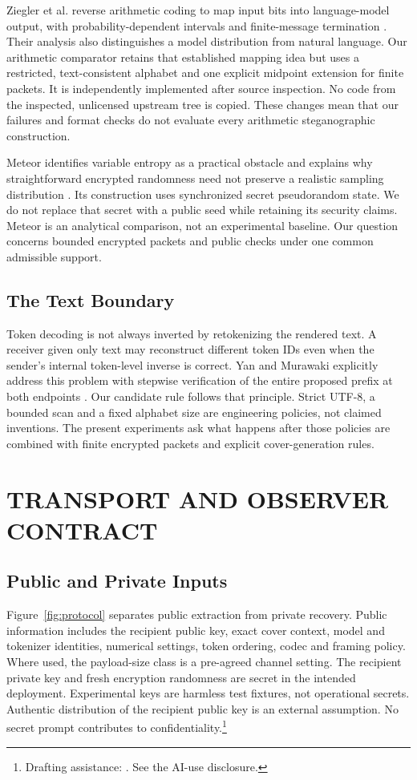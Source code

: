 \documentclass[a4paper,twoside]{article}
\newcommand{\aidraft}{\footnote{Drafting assistance: \cite{openai2026codex}. See the AI-use disclosure.}}
\begin{document}
Ziegler et al. reverse arithmetic coding to map input bits into language-model output, with probability-dependent intervals and finite-message termination \cite{ziegler2019neural}. Their analysis also distinguishes a model distribution from natural language. Our arithmetic comparator retains that established mapping idea but uses a restricted, text-consistent alphabet and one explicit midpoint extension for finite packets. It is independently implemented after source inspection. No code from the inspected, unlicensed upstream tree is copied. These changes mean that our failures and format checks do not evaluate every arithmetic steganographic construction.

Meteor identifies variable entropy as a practical obstacle and explains why straightforward encrypted randomness need not preserve a realistic sampling distribution \cite{kaptchuk2021meteor}. Its construction uses synchronized secret pseudorandom state. We do not replace that secret with a public seed while retaining its security claims. Meteor is an analytical comparison, not an experimental baseline. Our question concerns bounded encrypted packets and public checks under one common admissible support.

\subsection{The Text Boundary}
\noindent Token decoding is not always inverted by retokenizing the rendered text. A receiver given only text may reconstruct different token IDs even when the sender's internal token-level inverse is correct. Yan and Murawaki explicitly address this problem with stepwise verification of the entire proposed prefix at both endpoints \cite{yan2025tokenization}. Our candidate rule follows that principle. Strict UTF-8, a bounded scan and a fixed alphabet size are engineering policies, not claimed inventions. The present experiments ask what happens after those policies are combined with finite encrypted packets and explicit cover-generation rules.

\section{TRANSPORT AND OBSERVER CONTRACT}
\label{sec:contract}
\subsection{Public and Private Inputs}
\noindent Figure~\ref{fig:protocol} separates public extraction from private recovery. Public information includes the recipient public key, exact cover context, model and tokenizer identities, numerical settings, token ordering, codec and framing policy. Where used, the payload-size class is a pre-agreed channel setting. The recipient private key and fresh encryption randomness are secret in the intended deployment. Experimental keys are harmless test fixtures, not operational secrets. Authentic distribution of the recipient public key is an external assumption. No secret prompt contributes to confidentiality.\aidraft
\end{document}
